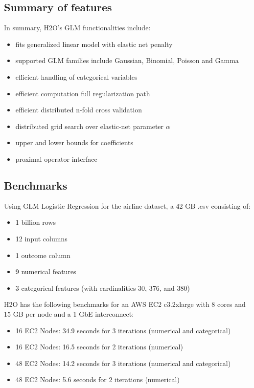 \documentclass[11pt]{article}
\begin{document}
\subsection{Summary of features} 
In summary, H2O's GLM functionalities include:


\begin{itemize} 
\item fits generalized linear model with elastic net penalty
\item supported GLM families include Gaussian, Binomial, Poisson and Gamma
\item efficient handling of categorical variables
\item efficient computation full regularization path
\item efficient distributed n-fold cross validation
\item distributed grid search over elastic-net parameter $\alpha$
\item upper and lower bounds for coefficients
\item proximal operator interface
\end{itemize}

\subsection{Benchmarks}

Using GLM Logistic Regression for the airline dataset, a 42 GB .csv consisting of: 

\begin{itemize}
\item 1 billion rows
\item 12 input columns
\item 1 outcome column
\item 9 numerical features
\item 3 categorical features (with cardinalities 30, 376, and 380)
\end{itemize}

H2O has the following benchmarks for an AWS EC2 c3.2xlarge with 8 cores and 15 GB per node and a 1 GbE interconnect: 
\begin{itemize}
\item 16 EC2 Nodes: 34.9 seconds for 3 iterations (numerical and categorical)
\item 16 EC2 Nodes: 16.5 seconds for 2 iterations (numerical)
\item 48 EC2 Nodes: 14.2 seconds for 3 iterations (numerical and categorical)
\item 48 EC2 Nodes: 5.6 seconds for 2 iterations (numerical)
\end{itemize}
\end{document}
